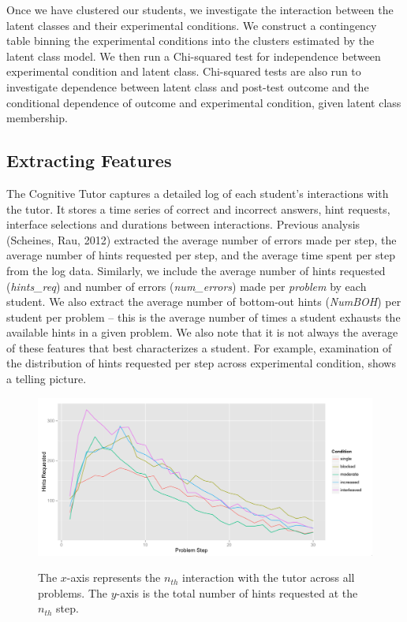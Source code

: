 \documentclass{edm_template}
\begin{document}
Once we have clustered our students, we investigate the interaction between the latent classes and their experimental conditions. We construct a contingency table binning the experimental conditions into the clusters estimated by the latent class model. We then run a Chi-squared test for independence between experimental condition and latent class. Chi-squared tests are also run to investigate dependence between latent class and post-test outcome and the conditional dependence of outcome and experimental condition, given latent class membership.

\subsection{Extracting Features}
The Cognitive Tutor captures a detailed log of each student's interactions with the tutor. It stores a time series of correct and incorrect answers, hint requests, interface selections and durations between interactions. Previous analysis (Scheines, Rau, 2012) extracted the average number of errors made per step, the average number of hints requested per step, and the average time spent per step from the log data. Similarly, we include the average number of hints requested (\emph{hints\_req}) and number of errors (\emph{num\_errors}) made per \emph{problem} by each student. We also extract the average number of bottom-out hints (\emph{NumBOH}) per student per problem -- this is the average number of times a student exhausts the available hints in a given problem. We also note that it is not always the average of these features that best characterizes a student. For example, examination of the distribution of hints requested per step across experimental condition, shows a telling picture. 
\begin{figure}[htbp]
\centering
\includegraphics[scale=.35]{hintsByCondition.png}\\
\caption{The $x$-axis represents the $n_{th}$ interaction with the tutor across all problems. The $y$-axis is the total number of hints requested at the $n_{th}$ step.  }
\label{fig:condition-graph}
\end{figure}
\end{document}
